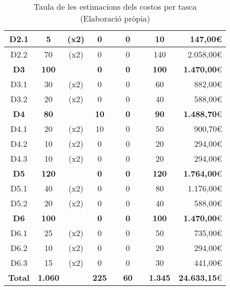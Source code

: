 \begin{table}[H]
\begin{tabular}{|c|cc|cc|cc|c|r|}
    D2.1	&	5	&	{\footnotesize	(x2)}	&	0	&	&	0	&	&	10	&	147,00\euro	\\	\hline
    D2.2	&	70	&	{\footnotesize	(x2)}	&	0	&	&	0	&	&	140	&	2.058,00\euro	\\	\hline
    \textbf{D3}	&	\textbf{100}	&	&	\textbf{0}	&	&	\textbf{0}	&	&	\textbf{100}	&	\textbf{1.470,00}\euro	\\	\hline
    D3.1	&	30	&	{\footnotesize	(x2)}	&	0	&	&	0	&	&	60	&	882,00\euro	\\	\hline
    D3.2	&	20	&	{\footnotesize	(x2)}	&	0	&	&	0	&	&	40	&	588,00\euro	\\	\hline
    \textbf{D4}	&	\textbf{80}	&	&	\textbf{10}	&	&	\textbf{0}	&	&	\textbf{90}	&	\textbf{1.488,70}\euro	\\	\hline
    D4.1	&	20	&	{\footnotesize	(x2)}	&	10	&	&	0	&	&	50	&	900,70\euro	\\	\hline
    D4.2	&	10	&	{\footnotesize	(x2)}	&	0	&	&	0	&	&	20	&	294,00\euro	\\	\hline
    D4.3	&	10	&	{\footnotesize	(x2)}	&	0	&	&	0	&	&	20	&	294,00\euro	\\	\hline
    \textbf{D5}	&	\textbf{120}	&	&	\textbf{0}	&	&	\textbf{0}	&	&	\textbf{120}	&	\textbf{1.764,00}\euro	\\	\hline
    D5.1	&	40	&	{\footnotesize	(x2)}	&	0	&	&	0	&	&	80	&	1.176,00\euro	\\	\hline
    D5.2	&	20	&	{\footnotesize	(x2)}	&	0	&	&	0	&	&	40	&	588,00\euro	\\	\hline
    \textbf{D6}	&	\textbf{100}	&	&	\textbf{0}	&	&	\textbf{0}	&	&	\textbf{100}	&	\textbf{1.470,00}\euro	\\	\hline
    D6.1	&	25	&	{\footnotesize	(x2)}	&	0	&	&	0	&	&	50	&	735,00\euro	\\	\hline
    D6.2	&	10	&	{\footnotesize	(x2)}	&	0	&	&	0	&	&	20	&	294,00\euro	\\	\hline
    D6.3	&	15	&	{\footnotesize	(x2)}	&	0	&	&	0	&	&	30	&	441,00\euro	\\	\hline
    \textbf{Total}	&	\textbf{1.060}	&	&	\textbf{225}	&	&	\textbf{60}	&	&	\textbf{1.345}	&	\textbf{24.633,15}\euro	\\	\hline
    \end{tabular}
    \caption[Costos per tasca]{Taula de les estimacions dels costos per tasca \\ (Elaboració pròpia)}
    \label{fig:costos_tasques}
\end{table}











